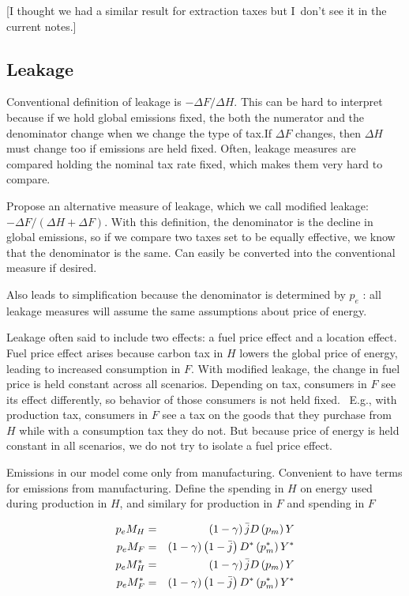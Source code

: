 \documentclass[notitlepage,12pt]{article}
\begin{document}
[I thought we had a similar result for extraction taxes but I\ don't see it
in the current notes.]

\subsection{Leakage}

Conventional definition of leakage is $-\Delta F/\Delta H$. This can be hard
to interpret because if we hold global emissions fixed, the both the
numerator and the denominator change when we change the type of tax.If $%
\Delta F$ changes, then $\Delta H$ must change too if emissions are held
fixed. Often, leakage measures are compared holding the nominal tax rate
fixed, which makes them very hard to compare.

Propose an alternative measure of leakage, which we call modified leakage: $%
-\Delta F/\left( \Delta H+\Delta F\right) $. With this definition, the
denominator is the decline in global emissions, so if we compare two taxes
set to be equally effective, we know that the denominator is the same. Can
easily be converted into the conventional measure if desired.

Also leads to simplification because the denominator is determined by $p_{e}$%
: all leakage measures will assume the same assumptions about price of
energy.

Leakage often said to include two effects: a fuel price effect and a
location effect. Fuel price effect arises because carbon tax in $H$ lowers
the global price of energy, leading to increased consumption in $F$. With
modified leakage, the change in fuel price is held constant across all
scenarios. Depending on tax, consumers in $F$ see its effect differently, so
behavior of those consumers is not held fixed. \ E.g., with production tax,
consumers in $F$ see a tax on the goods that they purchase from $H$ while
with a consumption tax they do not. But because price of energy is held
constant in all scenarios, we do not try to isolate a fuel price effect.

Emissions in our model come only from manufacturing. Convenient to have
terms for emissions from manufacturing. Define the spending in $H$ on energy
used during production in $H$, and similary for production in $F$ and
spending in $F$

\begin{eqnarray}
p_{e}M_{H} &=&\left( 1-\gamma \right) \bar{j}D\left( p_{m}\right) Y  \notag
\\
p_{e}M_{F} &=&\left( 1-\gamma \right) \left( 1-\bar{j}\right) D^{\ast
}\left( p_{m}^{\ast }\right) Y^{\ast }  \notag \\
p_{e}M_{H}^{\ast } &=&\left( 1-\gamma \right) \bar{j}D\left( p_{m}\right) Y 
\notag \\
p_{e}M_{F}^{\ast } &=&\left( 1-\gamma \right) \left( 1-\bar{j}\right)
D^{\ast }\left( p_{m}^{\ast }\right) Y^{\ast }
\end{eqnarray}
\end{document}
